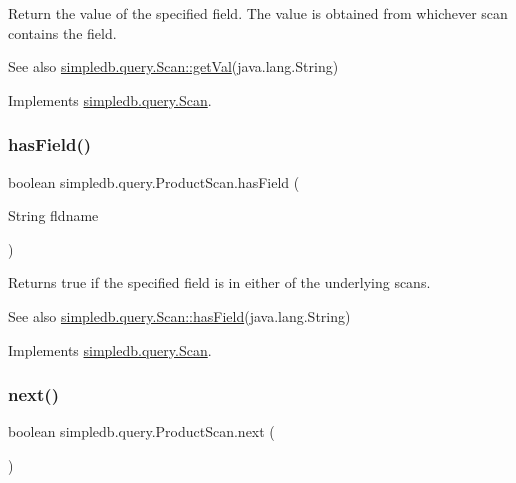 Return the value of the specified field. The value is obtained from whichever scan contains the field. \begin{DoxySeeAlso}{See also}
\hyperlink{interfacesimpledb_1_1query_1_1Scan_aca80bca2857c983a88834bf6c01ee5ca}{simpledb.\+query.\+Scan\+::get\+Val}(java.\+lang.\+String) 
\end{DoxySeeAlso}


Implements \hyperlink{interfacesimpledb_1_1query_1_1Scan_aca80bca2857c983a88834bf6c01ee5ca}{simpledb.\+query.\+Scan}.

\mbox{\label{classsimpledb_1_1query_1_1ProductScan_a06c138c93e98cede58b6421c93aa451d}} 
\subsubsection{\texorpdfstring{has\+Field()}{hasField()}}
{\footnotesize\ttfamily boolean simpledb.\+query.\+Product\+Scan.\+has\+Field (\begin{DoxyParamCaption}\item[{String}]{fldname }\end{DoxyParamCaption})\hspace{0.3cm}{\ttfamily [inline]}}

Returns true if the specified field is in either of the underlying scans. \begin{DoxySeeAlso}{See also}
\hyperlink{interfacesimpledb_1_1query_1_1Scan_a8f4ccf13eed0bed983c928e9b998fe5c}{simpledb.\+query.\+Scan\+::has\+Field}(java.\+lang.\+String) 
\end{DoxySeeAlso}


Implements \hyperlink{interfacesimpledb_1_1query_1_1Scan_a8f4ccf13eed0bed983c928e9b998fe5c}{simpledb.\+query.\+Scan}.

\mbox{\label{classsimpledb_1_1query_1_1ProductScan_a5c467cd753d2b088b96b649c7b8cf420}} 
\subsubsection{\texorpdfstring{next()}{next()}}
{\footnotesize\ttfamily boolean simpledb.\+query.\+Product\+Scan.\+next (\begin{DoxyParamCaption}{ }\end{DoxyParamCaption})\hspace{0.3cm}{\ttfamily [inline]}}

